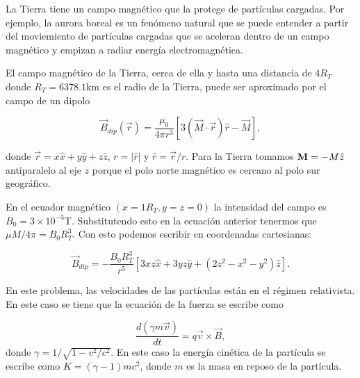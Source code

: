 \documentclass[11pt,letterpaper]{exam}
\begin{document}
\begin{questions}


La Tierra tiene un campo magn\'etico que la protege de part\'iculas
cargadas. Por ejemplo, la aurora boreal es un fen\'omeno natural que se puede
entender a partir del moviemiento de part\'iculas cargadas que se
aceleran dentro de un campo magn\'etico y empizan a radiar energ\'ia
electromagn\'etica.  

El campo magn\'etico de la Tierra, cerca de ella y hasta una distancia
de 4$R_{T}$ donde $R_T=6378.1$km es el radio de  la Tierra, puede ser
aproximado por el campo de un dipolo 

\begin{equation}
\vec{B}_{dip}(\vec{r}) = \frac{\mu_0}{4\pi r^3}[3(\vec{M}\cdot\vec{
    r})\hat{r}-\vec{M}], 
\end{equation}

donde $\vec{r}=x\hat{x} + y\hat{y} + z\hat{z}$, $r=|\hat{r}|$ y
$\hat{r}=\vec{r}/r$. Para la Tierra tomamos ${\bf M}=-M\hat{z}$
  antiparalelo al eje $z$ porque el polo norte magn\'etico es cercano
  al polo sur geogr\'afico. 

En el ecuador magn\'etico $(x=1R_T,y=z=0)$ la intensidad del campo es
$B_0=3\times 10^{-5}$T. Substitutendo esto en la ecuaci\'on anterior
tenermos que $\mu M/4\pi=B_0R_T^3$. Con esto podemos escribir en
coordenadas cartesianas:

\begin{equation}
\vec{B}_{dip} = -\frac{B_0 R_T^3}{r^5}[3xz\hat{x} + 3yz\hat{y} + (2z^2
  - x^2 -y^2)\hat{z}].
\end{equation}

En este problema, las velocidades de las part\'iculas est\'an en el
r\'egimen relativista. En este caso se tiene que la ecuaci\'on de la
fuerza se escribe como  
 
\begin{equation}
\frac{d(\gamma m \vec{v})}{dt} = q\vec{v}\times\vec{B}, 
\end{equation}
%
donde $\gamma=1/\sqrt{1-v^2/c^2}$. En este caso la energ\'ia
cin\'etica de la part\'icula se escribe como $K=(\gamma -1)mc^2$,
donde $m$ es la masa en reposo de la part\'icula.  

\begin{itemize}


\end{itemize}
\end{questions}
\end{document}
